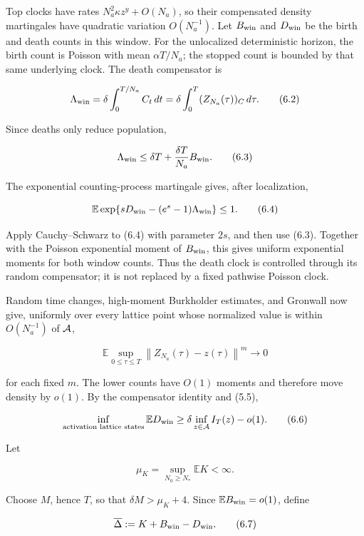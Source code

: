 Top clocks have rates \(N_a^2\kappa z^y+O(N_a)\), so their compensated
density martingales have quadratic variation \(O(N_a^{-1})\). Let
\(B_{\rm win}\) and \(D_{\rm win}\) be the birth and death counts in
this window. For the unlocalized deterministic horizon, the birth count
is Poisson with mean \(\alpha T/N_a\); the stopped count is bounded by
that same underlying clock. The death compensator is

\[
 \Lambda_{\rm win}
 =\delta\int_0^{T/N_a}C_t\,dt
 =\delta\int_0^T (Z_{N_a}(\tau))_C\,d\tau.             \tag{6.2}
\]

Since deaths only reduce population,

\[
 \Lambda_{\rm win}
 \le\delta T+
 {\delta T\over N_a}B_{\rm win}.                       \tag{6.3}
\]

The exponential counting-process martingale gives, after localization,

\[
 \mathbb E\exp\{sD_{\rm win}-(e^s-1)\Lambda_{\rm win}\}\le1.            \tag{6.4}
\]

Apply Cauchy--Schwarz to (6.4) with parameter \(2s\), and then use
(6.3). Together with the Poisson exponential moment of \(B_{\rm win}\),
this gives uniform exponential moments for both window counts. Thus the
death clock is controlled through its random compensator; it is not
replaced by a fixed pathwise Poisson clock.

Random time changes, high-moment Burkholder estimates, and Gronwall now
give, uniformly over every lattice point whose normalized value is
within \(O(N_a^{-1})\) of \({\cal A}\),

\[
 \mathbb E\sup_{0\le\tau\le T}
 \left\lVert Z_{N_a}(\tau)-z(\tau)\right\rVert^m
 \longrightarrow0                                    \tag{6.5}
\]

for each fixed \(m\). The lower counts have \(O(1)\) moments and
therefore move density by \(o(1)\). By the compensator identity and
(5.5),

\[
 \inf_{\text{activation lattice states}}\mathbb E D_{\rm win}
 \ge\delta\inf_{z\in{\cal A}}I_T(z)-o(1).              \tag{6.6}
\]

Let

\[
                       \mu_K=\sup_{N_0\ge N_*}\mathbb EK<\infty.
\]

Choose \(M\), hence \(T\), so that \(\delta M>\mu_K+4\). Since
\(\mathbb EB_{\rm win}=o(1)\), define

\[
                       \overline\Delta
                       :=K+B_{\rm win}-D_{\rm win}.     \tag{6.7}
\]

